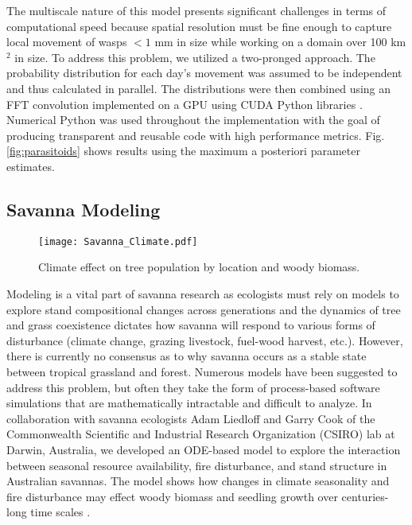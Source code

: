 \documentclass[11pt]{article}
\begin{document}
The multiscale nature of this model presents significant challenges in terms of computational speed because spatial resolution must be fine enough to capture local movement of wasps $<1$ mm in size while working on a domain over 100 km$^2$ in size. To address this problem, we utilized a two-pronged approach. The probability distribution for each day's movement was assumed to be independent and thus calculated in parallel. The distributions were then combined using an FFT convolution implemented on a GPU using CUDA Python libraries \cite{pycuda}. Numerical Python was used throughout the implementation with the goal of producing transparent and reusable code with high performance metrics. Fig. \ref{fig:parasitoids} shows results using the maximum a posteriori parameter estimates.

\subsection{Savanna Modeling}
\label{sec:savanna}

\begin{wrapfigure}{R}{0.5\textwidth}
\vspace{-25pt}
\begin{center}
\texttt{[image: Savanna\_Climate.pdf]}%
\vspace{-5pt}
\caption{Climate effect on tree population by location and woody biomass.}
\label{fig:climate}
\vspace{-20pt}
\end{center}
\end{wrapfigure}
Modeling is a vital part of savanna research as ecologists must rely on models to explore stand compositional changes across generations and the dynamics of tree and grass coexistence dictates how savanna will respond to various forms of disturbance (climate change, grazing livestock, fuel-wood harvest, etc.). However, there is currently no consensus as to why savanna occurs as a stable state between tropical grassland and forest. Numerous models have been suggested to address this problem, but often they take the form of process-based software simulations that are mathematically intractable and difficult to analyze. In collaboration with savanna ecologists Adam Liedloff and Garry Cook \cite{Liedloff07} of the Commonwealth Scientific and Industrial Research Organization (CSIRO) lab at Darwin, Australia, we developed an ODE-based model to explore the interaction between seasonal resource availability, fire disturbance, and stand structure in Australian savannas. The model shows how changes in climate seasonality and fire disturbance may effect woody biomass and seedling growth over centuries-long time scales \cite{Strickland14}.
\end{document}

